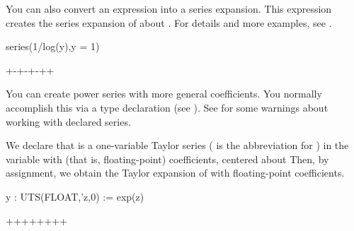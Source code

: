 {{{{{{{{{{{{{{\begin{xtc}
\begin{xtccomment}
You can also convert an expression into a series expansion.
This expression creates the series expansion of 
about .
For details and more examples, see
.
\end{xtccomment}
\begin{spadsrc}
series(1/log(y),y = 1)
\end{spadsrc}
\begin{TeXOutput}
\begin{fricasmath}{6}
+-{\TIMES {}}+\TIMES {}-{\TIMES {}}+\TIMES {}-{\TIMES {}}+\TIMES {}+%
%
\end{fricasmath}
\end{TeXOutput}
\end{xtc}

You can create power series with more general coefficients.
You normally accomplish this via a type declaration (see
).
See  for some warnings about
working with declared series.

\begin{xtc}
\begin{xtccomment}
We declare that  is a one-variable Taylor series
( is the abbreviation for )
in the variable  with 
(that is, floating-point) coefficients, centered about 
Then, by assignment, we obtain the Taylor expansion of
 with floating-point coefficients.
\end{xtccomment}
\begin{spadsrc}
y : UTS(FLOAT,'z,0) := exp(z) 
\end{spadsrc}
\begin{TeXOutput}
\begin{fricasmath}{7}
++\TIMES {}+\TIMES {}+\TIMES {}+\TIMES {}+\TIMES {}+\TIMES {}+%
\end{fricasmath}
\end{TeXOutput}
\end{xtc}

}}}}}}}}}}}}}}
